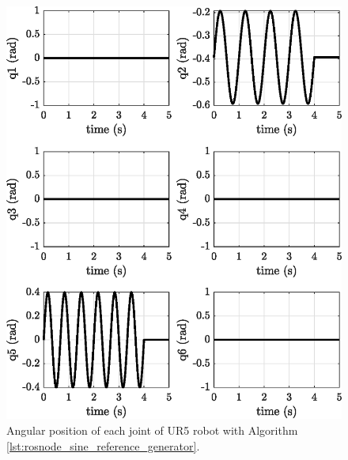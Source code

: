 \begin{figure}
    \centering
    \includegraphics{images/act_1.1/joint_position.eps}
    \caption{Angular position of each joint of UR5 robot with Algorithm \ref{lst:rosnode_sine_reference_generator}.}
    \label{fig:act_1.1_joint_position}
\end{figure}

